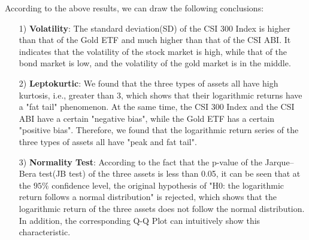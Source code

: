 \noindent According to the above results, we can draw the following conclusions:
\begin{itemize}
    \item[1)] \textbf{Volatility}: The standard deviation(SD) of the CSI 300 Index is higher than that of the Gold ETF and much higher than that of the CSI ABI. It indicates that the volatility of the stock market is high, while that of the bond market is low, and the volatility of the gold market is in the middle.
    \item[2)] \textbf{Leptokurtic}: We found that the three types of assets all have high kurtosis, i.e., greater than 3, which shows that their logarithmic returns have a "fat tail" phenomenon. At the same time, the CSI 300 Index and the CSI ABI have a certain "negative bias", while the Gold ETF has a certain "positive bias". Therefore, we found that the logarithmic return series of the three types of assets all have "peak and fat tail".
    \item[3)] \textbf{Normality Test}: According to the fact that the p-value of the Jarque–Bera test(JB test) of the three assets is less than 0.05, it can be seen that at the $95\%$ confidence level, the original hypothesis of "H0: the logarithmic return follows a normal distribution" is rejected, which shows that the logarithmic return of the three assets does not follow the normal distribution. In addition, the corresponding Q-Q Plot can intuitively show this characteristic.
\end{itemize}


